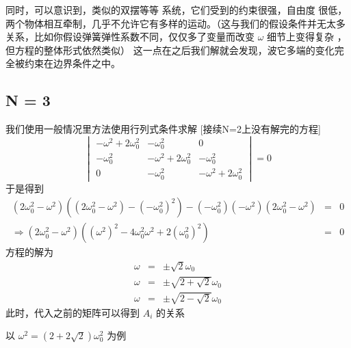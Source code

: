 \documentclass[11pt]{book}
\begin{document}
同时，可以意识到，类似的双摆等等
系统，它们受到的约束很强，自由度 很低，两个物体相互牵制，几乎不允许它有多样的运动。（这与我们的假设条件并无太多关系，比如你假设弹簧弹性系数不同，仅仅多了变量而改变 \(\omega\) 细节上变得复杂 ，但方程的整体形式依然类似）
这一点在之后我们解就会发现，波它多端的变化完全被约束在边界条件之中。
\subsection{N = 3}
\label{sec:org63deea6}
我们使用一般情况里方法使用行列式条件求解 [接续N=2上没有解完的方程]
\begin{equation}
\label{eq:18}
\begin{vmatrix}
-\omega^2+2\omega_0^2&-\omega_0^2&0\\
-\omega_0^2&-\omega^2+2\omega_0^2&-\omega_0^2\\
0&-\omega_0^2&-\omega^2+2\omega_0^2
\end{vmatrix}=0
\end{equation}
于是得到
\begin{eqnarray}
\label{eq:15}
(2\omega_0^2-\omega^2)((2\omega_0^2-\omega^2)-(-\omega_0^2)^2)-(-\omega_0^2)(-\omega^2)(2\omega_0^2-\omega^2) & = & 0\\
\Rightarrow (2\omega_0^2-\omega^2)((\omega^2)^2-4\omega_0^2\omega^2+2(\omega_0^2)^2) & = & 0
\end{eqnarray}
方程的解为
\begin{eqnarray}
\label{eq:21}
\omega&=&\pm \sqrt{2}\omega_0 \\
\omega&=&\pm \sqrt{2+\sqrt{2}}\omega_0 \\
\omega&=&\pm \sqrt{2-\sqrt{2}}\omega_0 
\end{eqnarray}
此时，代入之前的矩阵可以得到 \(A_i\) 的关系

以 \(\omega^2=(2+2 \sqrt{2})\omega_0^2\) 为例
\end{document}

